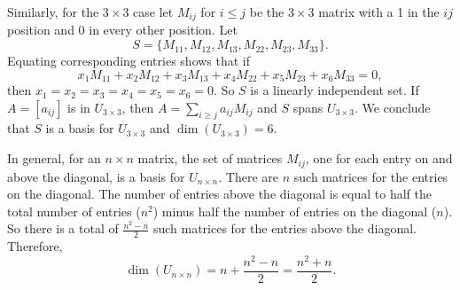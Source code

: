 \begin{example}
Similarly, for the $3 \times 3$ case let $M_{ij}$ for $i \leq j$ be the $3 \times 3$ matrix with a 1 in the $ij$ position and 0 in every other position. Let 
\[S = \{M_{11}, M_{12}, M_{13}, M_{22}, M_{23}, M_{33}\}.\]
Equating corresponding entries shows that if 
\[x_1M_{11} +  x_2M_{12} + x_3M_{13} + x_4 M_{22}+ x_5 M_{23} + x_6M_{33} = 0,\]
then $x_1 = x_2 = x_3 = x_4 = x_5 = x_6 = 0$. So $S$ is a linearly independent set. If $A = [a_{ij}]$ is in $U_{3 \times 3}$, then $A = \sum_{i \geq j} a_{ij}M_{ij}$ and $S$ spans $U_{3 \times 3}$. We conclude that $S$ is a basis for $U_{3 \times 3}$ and $\dim(U_{3 \times 3}) = 6$. 

In general, for an $n \times n$ matrix, the set of matrices $M_{ij}$, one for each entry on and above the diagonal, is a basis for $U_{n \times n}$. There are $n$ such matrices for the entries on the diagonal. The number of entries above the diagonal is equal to half the total number of entries ($n^2$) minus half the number of entries on the diagonal ($n$). So there is a total of $\frac{n^2-n}{2}$ such matrices for the entries above the diagonal. Therefore, 
\[\dim(U_{n \times n}) = n+\frac{n^2-n}{2} = \frac{n^2+n}{2}.\] 


\ea

\end{example}



\label{sec:dims_summ}

